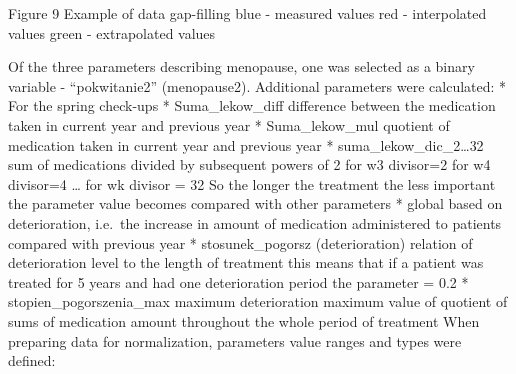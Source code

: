 \documentclass[10pt,oneside]{memoir}
\begin{document}
Figure 9 Example of data gap-filling
blue - measured values
red - interpolated values
green - extrapolated values


Of the three parameters describing menopause, one was selected as a binary variable - ``pokwitanie2'' (menopause2).
Additional parameters were calculated:
* For the spring check-ups
* Suma\_lekow\_diff
difference between the medication taken in current year and previous year
* Suma\_lekow\_mul
quotient of medication taken in current year and previous year
* suma\_lekow\_dic\_2{\ldots}32
sum of medications divided by subsequent powers of 2
for w3 divisor=2
for w4 divisor=4
{\ldots}
for wk divisor = 32
So the longer the treatment the less important the parameter value becomes compared with other parameters
* global
based on deterioration, i.e.\ the increase in amount of medication administered to patients compared with previous year
* stosunek\_pogorsz (deterioration)
relation of deterioration level to the length of treatment
this means that if a patient was treated for 5 years and had one deterioration period the parameter = 0.2
* stopien\_pogorszenia\_max
maximum deterioration
maximum value of quotient of sums of medication amount throughout the whole period of treatment
When preparing data for normalization, parameters value ranges and types were defined:
\end{document}
